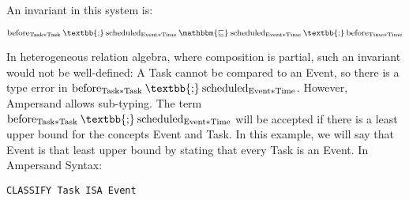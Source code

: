 \documentclass[12pt]{article}
\newcommand{\typesemi}{\mathbin{\text{\textbb{;}}}}
\newcommand{\typesubset}{\mathbin{\mathbbm{\sqsubseteq}}}
\begin{document}
An invariant in this system is:

\[
\mathrm{before}_{\mathrm{Task * Task}}\typesemi\mathrm{scheduled}_{\mathrm{Event * Time}} \typesubset \mathrm{scheduled}_\mathrm{Event * Time}\typesemi\mathrm{before}_{\mathrm{Time * Time}}
\]

In heterogeneous relation algebra, where composition is partial, such an invariant would not be well-defined: A Task cannot be compared to an Event, so there is a type error in $\mathrm{before}_{\mathrm{Task * Task}}\typesemi\mathrm{scheduled}_{\mathrm{Event * Time}}$.
However, Ampersand allows sub-typing.
The term $\mathrm{before}_{\mathrm{Task * Task}}\typesemi\mathrm{scheduled}_{\mathrm{Event * Time}}$ will be accepted if there is a least upper bound for the concepts Event and Task.
In this example, we will say that Event is that least upper bound by stating that every Task is an Event.
In Ampersand Syntax:

\begin{verbatim}
CLASSIFY Task ISA Event
\end{verbatim}
\end{document}
